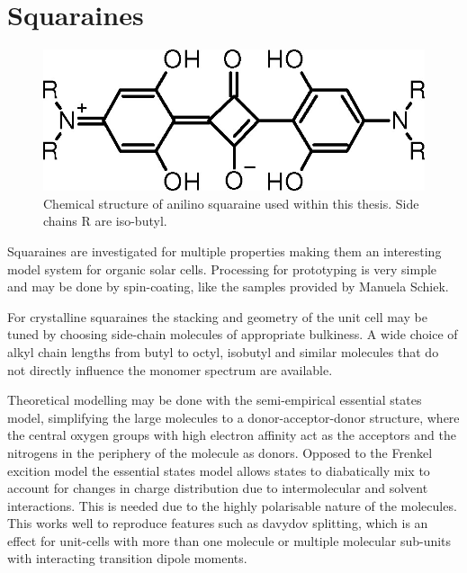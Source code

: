 \documentclass[twoside,openright,listof=numbered]{scrreprt}
\begin{document}
\section{Squaraines}
\begin{figure}[hbtp]
\centering
\includegraphics[width=0.6\linewidth]{images/nAlinoSquaraine.jpeg}
\caption[Chemical structure of anilino squaraine.]{Chemical structure of anilino squaraine used within this thesis. Side chains R are iso-butyl.\label{fig:chemStructureSQIB}}
\end{figure}

Squaraines are investigated for multiple properties making them an interesting model system for organic solar cells. Processing for prototyping is very simple and may be done by spin-coating, like the samples provided by Manuela Schiek.

For crystalline squaraines the stacking and geometry of the unit cell may be tuned by choosing side-chain molecules of appropriate bulkiness. A wide choice of alkyl chain lengths from butyl to octyl, isobutyl and similar molecules that do not directly influence the monomer spectrum are available. \cite{Hestand2015, Brueck2014, Balzer2022} 

Theoretical modelling may be done with the semi-empirical essential states model, simplifying the large molecules to a donor-acceptor-donor structure, where the central oxygen groups with high electron affinity act as the acceptors and the nitrogens in the periphery of the molecule as donors. Opposed to the Frenkel excition model the essential states model allows states to diabatically mix to account for changes in charge distribution due to intermolecular and solvent interactions. This is needed due to the highly polarisable nature of the molecules. This works well to reproduce features such as davydov splitting, which is an effect for unit-cells with more than one molecule or multiple molecular sub-units with interacting transition dipole moments.\cite{Zhong2019, Hestand2015} 
\end{document}
